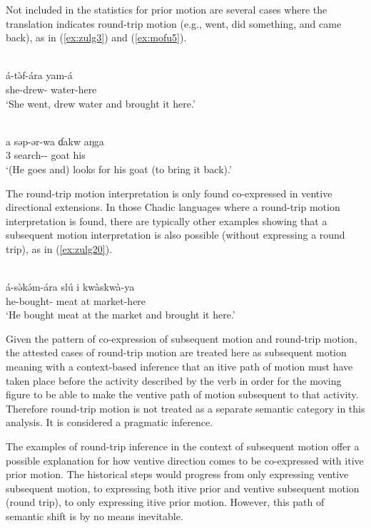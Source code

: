 Not included in the statistics for prior motion are several cases where the translation indicates round-trip motion (e.g., went, did something, and came back), as in (\ref{ex:zulg3}) and (\ref{ex:mofu5}). 

\ea\label{ex:zulg3}
 \\
\gll á-tə̀f-ára yam-á \\
she-drew- water-here \\
\glt `She went, drew water and brought it here.'

\ex\label{ex:mofu5}
 \\
\gll  a səp-ər-wa ɗakw aŋga	\\
3 search-- goat his		\\
\glt `(He goes and) looks for his goat (to bring it back).'
\z 

The round-trip motion interpretation is only found co-expressed in ventive directional extensions. In those Chadic languages where a round-trip motion interpretation is found, there are typically other examples showing that a subsequent motion interpretation is also possible (without expressing a round trip), as in (\ref{ex:zulg20}).

\ea\label{ex:zulg20}
 \\
\gll á-sə̀kə́m-ára slú i kwàskwà-ya	\\
he-bought- meat at market-here		\\
\glt `He bought meat at the market and brought it here.'
\z 

Given the pattern of co-expression of subsequent motion and round-trip motion, the attested cases of round-trip motion are treated here as subsequent motion meaning with a context-based inference that an itive path of motion must have taken place before the activity described by the verb in order for the moving figure to be able to make the ventive path of motion subsequent to that activity. Therefore round-trip motion is not treated as a separate semantic category in this analysis. It is considered a pragmatic inference.

The examples of round-trip inference in the context of subsequent motion offer a possible explanation for how ventive direction comes to be co-expressed with itive prior motion. The historical steps would progress from only expressing ventive subsequent motion, to expressing both itive prior and ventive subsequent motion (round trip), to only expressing itive prior motion. However, this path of semantic shift is by no means inevitable. 

